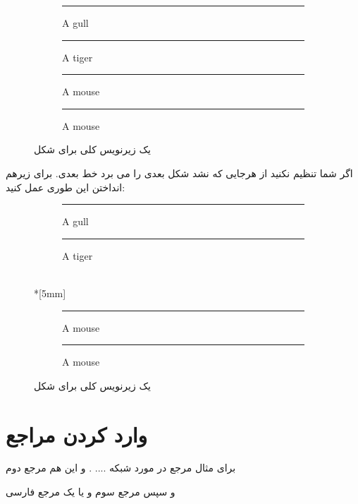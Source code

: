 \documentclass{report}
\begin{document}
\begin{figure}[ht]
\centering
\begin{subfigure}[b]{0.3\textwidth}\centering
\rule{2cm}{2cm}
\caption{A gull}
\label{fig:gull}
\end{subfigure}
\begin{subfigure}[b]{0.3\textwidth}\centering
\rule{2cm}{2cm}
\caption{A tiger}
\label{fig:tiger2}
\end{subfigure}
\begin{subfigure}[b]{0.3\textwidth}\centering
\rule{2cm}{2cm}
\caption{A mouse}
\label{fig:mouse}
\end{subfigure}
\begin{subfigure}[b]{0.3\textwidth}\centering
\rule{2cm}{2cm}
\caption{A mouse}
\label{fig:mouse2}
\end{subfigure}
\caption{یک زیرنویس کلی برای شکل}
\label{fig:animals}
\end{figure}
اگر شما تنظیم نکنید از هرجایی که نشد شکل بعدی را می برد خط بعدی.  برای زیرهم انداختن این طوری عمل کنید:
\begin{figure}[ht]
\centering
\begin{subfigure}[b]{0.3\textwidth}\centering
\rule{2cm}{2cm}
\caption{A gull}
\label{fig:gull2}
\end{subfigure}
\begin{subfigure}[b]{0.3\textwidth}\centering
\rule{2cm}{2cm}
\caption{A tiger}
\label{fig:tiger}
\end{subfigure}\\*[5mm]
\begin{subfigure}[b]{0.3\textwidth}\centering
\rule{2cm}{2cm}
\caption{A mouse}
\label{fig:mouse3}
\end{subfigure}
\begin{subfigure}[b]{0.3\textwidth}\centering
\rule{2cm}{2cm}
\caption{A mouse}
\label{fig:mouse4}
\end{subfigure}
\caption{یک زیرنویس کلی برای شکل}
\label{fig:dddd}
\end{figure}

\chapter{وارد کردن مراجع}
برای مثال مرجع {\cite{Beasley}} در مورد شبکه .... . و این هم مرجع دوم {\cite{Meyer2004}} 

و سپس مرجع سوم {\cite{Rafsanjani2010}} و یا یک مرجع فارسی
\cite{Unknown1389}
\end{document}
